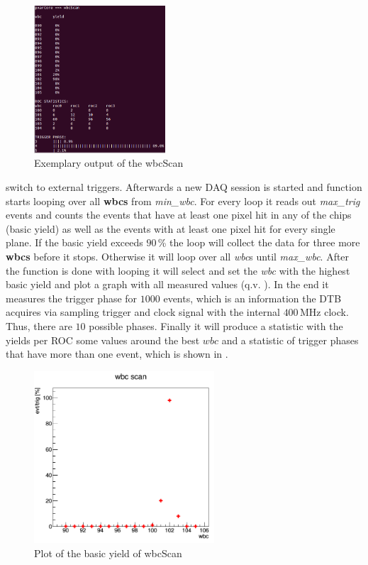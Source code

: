 \documentclass[british,11pt,a4paper]{memoir}
\begin{document}
\begin{figure}
	\vspace*{-10pt}
	\includegraphics[width=4.9cm]{wbcscan1}
	\caption{Exemplary output of the wbcScan}
	\label{pwbc1}
	\vspace*{-5pt}
\end{figure} switch to external triggers. Afterwards a new \ac{DAQ} session is started and function starts looping over all \textbf{wbcs} from \textit{min\_wbc}. For every loop it reads out \textit{max\_trig} events and counts the events that have at least one pixel hit in any of the chips (basic yield) as well as the events with at least one pixel hit for every single plane. If the basic yield exceeds $90\,$\% the loop will collect the data for three more \textbf{wbcs} before it stops. Otherwise it will loop over all \textit{wbc}s until \textit{max\_wbc}. After the function is done with looping it will select and set the \textit{wbc} with the highest basic yield and plot a graph with all measured values (q.v. ). In the end it measures the trigger phase for $1000$ events, which is an information the \ac{DTB} acquires via sampling trigger and clock signal with the internal $400\,$MHz clock. Thus, there are $10$ possible phases. Finally it will produce a statistic with the yields per \ac{ROC} some values around the best $wbc$ and a statistic of trigger phases that have more than one event, which is shown in .
\begin{figure}[ht]
	\centering
	\includegraphics[width=0.6\textwidth]{wbcscan2}
	\caption{Plot of the basic yield of wbcScan}
	\label{pwbc2}
\end{figure}\no
\end{document}
